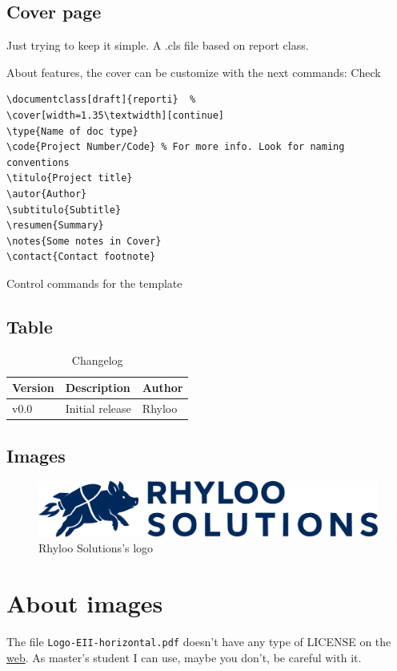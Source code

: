 \documentclass[english]{reporti}
\begin{document}
\subsection{Cover page}
\label{sec:org0ab1d51}
Just trying to keep it simple. A .cls file based on report class.

About features, the cover can be customize with the next commands: Check 

\begin{listing}[htbp]
\begin{verbatim}
\documentclass[draft]{reporti}  %
\cover[width=1.35\textwidth][continue]
\type{Name of doc type}
\code{Project Number/Code} % For more info. Look for naming conventions
\titulo{Project title} 
\autor{Author}
\subtitulo{Subtitle}
\resumen{Summary}
\notes{Some notes in Cover}
\contact{Contact footnote}
\end{verbatim}
\caption{Control commands for the template}
\end{listing}

\subsection{Table}
\label{sec:org7f12126}
\begin{table}[H]
\caption{Changelog}
\centering
\begin{tabular}{lll}
\hline
Version & Description & Author\\[0pt]
\hline
v0.0 & Initial release & Rhyloo\\[0pt]
\hline
\end{tabular}
\end{table}

\subsection{Images}
\label{sec:org9cf5d28}
\begin{figure}[htbp]
\centering
\includegraphics[fbox,width=.9\linewidth]{./figures/logo/rhyloo_solutions_horizontal.pdf}
\caption{Rhyloo Solutions's logo}
\end{figure}

\section{About images}
\label{sec:orgcbeb805}
The file \texttt{Logo-EII-horizontal.pdf} doesn't have any type of LICENSE on the \href{https://www.uma.es/escuela-de-ingenierias-industriales/info/108566/logo-simbolo-de-la-eii/}{web}. As master's student I can use, maybe you don't, be careful with it.
\end{document}
